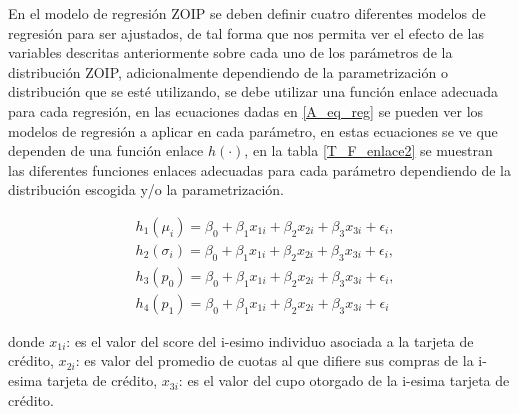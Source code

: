 En el modelo de regresi\'{o}n ZOIP se deben definir cuatro diferentes modelos de regresi\'{o}n para ser ajustados, de tal forma que nos permita ver el efecto de las variables descritas anteriormente sobre cada uno de los par\'{a}metros de la distribuci\'{o}n ZOIP, adicionalmente dependiendo de la parametrizaci\'{o}n o distribuci\'{o}n que se est\'{e} utilizando, se debe utilizar una funci\'{o}n enlace adecuada para cada regresi\'{o}n, en las ecuaciones dadas en \eqref{A_eq_reg} se pueden ver los modelos de regresi\'{o}n a aplicar en cada par\'{a}metro, en estas ecuaciones se ve que dependen de una funci\'{o}n enlace $h(\cdot)$, en la tabla \ref{T_F_enlace2} se muestran las diferentes funciones enlaces adecuadas para cada par\'{a}metro dependiendo de la distribuci\'{o}n escogida y/o la parametrizaci\'{o}n.

\begin{equation}
\begin{split}
&h_1(\mu_{i})=\beta_0+\beta_1 x_{1i}+\beta_2 x_{2i}+\beta_3 x_{3i}+\epsilon_i,\\
&h_2(\sigma_{i})=\beta_0+\beta_1 x_{1i}+\beta_2 x_{2i}+\beta_3 x_{3i}+\epsilon_i,\\
&h_3(p_0)=\beta_0+\beta_1 x_{1i}+\beta_2 x_{2i}+\beta_3 x_{3i}+\epsilon_i,\\
&h_4(p_1) =\beta_0+\beta_1 x_{1i}+\beta_2 x_{2i}+\beta_3 x_{3i}+\epsilon_i
\end{split}
\label{A_eq_reg}
\end{equation}

donde $x_{1i}$: es el valor del score del i-esimo individuo asociada a la tarjeta de cr\'{e}dito, $x_{2i}$: es valor del promedio de cuotas al que difiere sus compras de la i-esima tarjeta de cr\'{e}dito, $x_{3i}$: es el valor del cupo otorgado de la i-esima tarjeta de cr\'{e}dito. 

